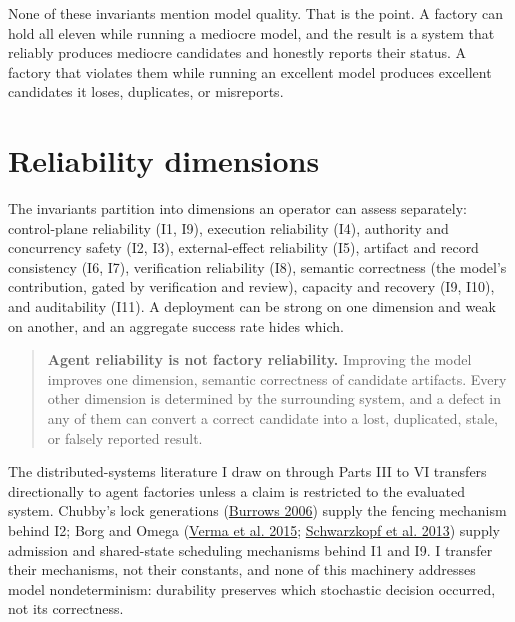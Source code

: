 None of these invariants mention model quality. That is the point. A factory can hold all eleven while running a mediocre model, and the result is a system that reliably produces mediocre candidates and honestly reports their status. A factory that violates them while running an excellent model produces excellent candidates it loses, duplicates, or misreports.

\hypertarget{reliability-dimensions}{%
\section*{Reliability dimensions}\label{reliability-dimensions}}

The invariants partition into dimensions an operator can assess separately: control-plane reliability (I1, I9), execution reliability (I4), authority and concurrency safety (I2, I3), external-effect reliability (I5), artifact and record consistency (I6, I7), verification reliability (I8), semantic correctness (the model's contribution, gated by verification and review), capacity and recovery (I9, I10), and auditability (I11). A deployment can be strong on one dimension and weak on another, and an aggregate success rate hides which.

\begin{quote}
\textbf{Agent reliability is not factory reliability.} Improving the model improves one dimension, semantic correctness of candidate artifacts. Every other dimension is determined by the surrounding system, and a defect in any of them can convert a correct candidate into a lost, duplicated, stale, or falsely reported result.
\end{quote}

The distributed-systems literature I draw on through Parts III to VI transfers directionally to agent factories unless a claim is restricted to the evaluated system. Chubby's lock generations (\href{https://www.usenix.org/conference/osdi-06/chubby-lock-service-loosely-coupled-distributed-systems}{Burrows 2006}) supply the fencing mechanism behind I2; Borg and Omega (\href{https://research.google/pubs/large-scale-cluster-management-at-google-with-borg/}{Verma et al. 2015}; \href{https://research.google/pubs/omega-flexible-scalable-schedulers-for-large-compute-clusters/}{Schwarzkopf et al. 2013}) supply admission and shared-state scheduling mechanisms behind I1 and I9. I transfer their mechanisms, not their constants, and none of this machinery addresses model nondeterminism: durability preserves which stochastic decision occurred, not its correctness.

